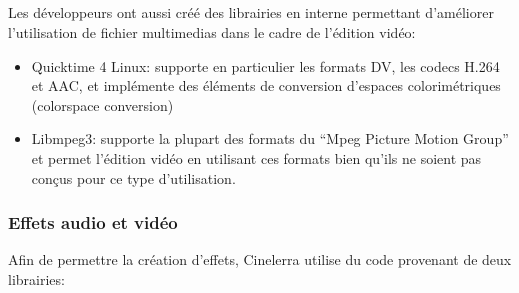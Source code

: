 \subparagraph{}

Les développeurs ont aussi créé des librairies en interne permettant
d'améliorer l'utilisation de fichier multimedias dans le cadre de
l'édition vidéo:

\begin{itemize}

  \item {Quicktime 4 Linux: supporte en particulier les formats DV,
    les codecs H.264 et AAC, et implémente des éléments de conversion
    d'espaces colorimétriques (colorspace conversion)}

  \item {Libmpeg3: supporte la plupart des formats du ``Mpeg Picture
    Motion Group''  et permet l'édition
    vidéo en utilisant ces formats bien qu'ils ne soient pas conçus
    pour ce type d'utilisation.}

\end{itemize}

\subsubsection {Effets audio et vidéo}

Afin de permettre la création d'effets, Cinelerra utilise du  code
provenant de deux librairies:


